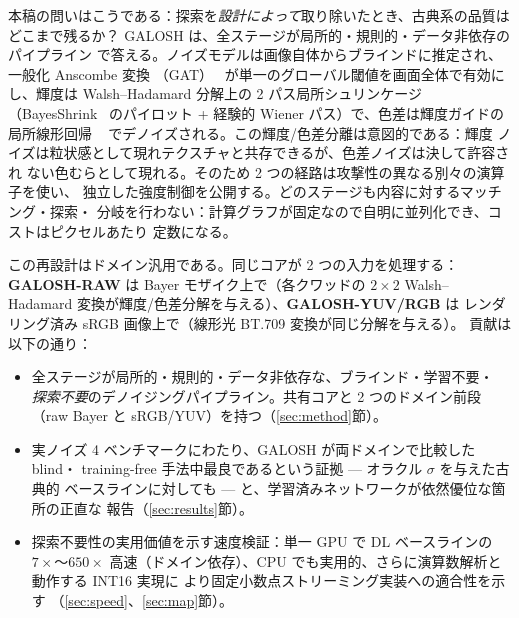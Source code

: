 \documentclass[10pt,twocolumn]{article}
\begin{document}
本稿の問いはこうである：探索を\emph{設計によって}取り除いたとき、古典系の品質は
どこまで残るか？ GALOSH は、全ステージが局所的・規則的・データ非依存のパイプライン
で答える。ノイズモデルは画像自体からブラインドに推定され、一般化 Anscombe 変換
（GAT）~\cite{foi} が単一のグローバル閾値を画面全体で有効にし、輝度は
Walsh--Hadamard 分解上の 2 パス局所シュリンケージ（BayesShrink~\cite{bayesshrink}
のパイロット + 経験的 Wiener パス）で、色差は輝度ガイドの局所線形回帰
~\cite{loess,kopf} でデノイズされる。この輝度/色差分離は意図的である：輝度
ノイズは粒状感として現れテクスチャと共存できるが、色差ノイズは決して許容され
ない色むらとして現れる。そのため 2 つの経路は攻撃性の異なる別々の演算子を使い、
独立した強度制御を公開する。どのステージも内容に対するマッチング・探索・
分岐を行わない：計算グラフが固定なので自明に並列化でき、コストはピクセルあたり
定数になる。

この再設計はドメイン汎用である。同じコアが 2 つの入力を処理する：
\textbf{GALOSH-RAW} は Bayer モザイク上で（各クワッドの $2{\times}2$
Walsh--Hadamard 変換が輝度/色差分解を与える）、\textbf{GALOSH-YUV/RGB} は
レンダリング済み sRGB 画像上で（線形光 BT.709 変換が同じ分解を与える）。
貢献は以下の通り：
\begin{itemize}\itemsep2pt
\item 全ステージが局所的・規則的・データ非依存な、ブラインド・学習不要・
\emph{探索不要}のデノイジングパイプライン。共有コアと 2 つのドメイン前段
（raw Bayer と sRGB/YUV）を持つ（\ref{sec:method}節）。
\item 実ノイズ 4 ベンチマークにわたり、GALOSH が両ドメインで比較した blind・
training-free 手法中最良であるという証拠 --- オラクル $\sigma$ を与えた古典的
ベースラインに対しても --- と、学習済みネットワークが依然優位な箇所の正直な
報告（\ref{sec:results}節）。
\item 探索不要性の実用価値を示す速度検証：単一 GPU で DL ベースラインの
$7\times$〜$650\times$ 高速（ドメイン依存）、CPU でも実用的、さらに演算数解析と
動作する INT16 実現に
より固定小数点ストリーミング実装への適合性を示す
（\ref{sec:speed}、\ref{sec:map}節）。
\end{itemize}

\end{document}
